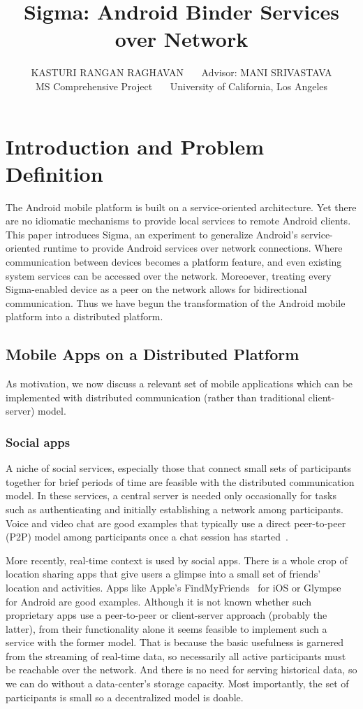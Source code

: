 \documentclass[prodmode]{acmlarge}
\title{Sigma: Android Binder Services over Network}
\author{KASTURI RANGAN RAGHAVAN~~~
Advisor: MANI SRIVASTAVA\\
MS Comprehensive Project~~~
University of California, Los Angeles
}
\begin{document}
\pagestyle{plain}
\maketitle
\tableofcontents

\clearpage
\section{Introduction and Problem Definition}

The Android mobile platform is built on a service-oriented architecture. Yet there are no idiomatic mechanisms to provide local services to remote Android clients. This paper introduces Sigma, an experiment to generalize Android's service-oriented runtime to provide Android services over network connections. Where communication between devices becomes a platform feature, and even existing system services can be accessed over the network. Moreoever, treating every Sigma-enabled device as a peer on the network allows for bidirectional communication. Thus we have begun the transformation of the Android mobile platform into a distributed platform.

\subsection{Mobile Apps on a Distributed Platform}
As motivation, we now discuss a relevant set of mobile applications which can be implemented with distributed communication (rather than traditional client-server) model.

\subsubsection{Social apps}
A niche of social services, especially those that connect small sets of participants together for brief periods of time are feasible with the distributed communication model. In these services, a central server is needed only occasionally for tasks such as authenticating and initially establishing a network among participants. Voice and video chat are good examples that typically use a direct peer-to-peer (P2P) model among participants once a chat session has started~\cite{SkypeStudy,GoogleTalkLibrary}.

More recently, real-time context is used by social apps. There is a whole crop of location sharing apps that give users a glimpse into a small set of friends' location and activities. Apps like Apple's FindMyFriends~\cite{FindMyFriends} for iOS or Glympse~\cite{Glympse} for Android are good examples. Although it is not known whether such proprietary apps use a peer-to-peer or client-server approach (probably the latter), from their functionality alone it seems feasible to implement such a service with the former model. That is because the basic usefulness is garnered from the streaming of real-time data, so necessarily all active participants must be reachable over the network. And there is no need for serving historical data, so we can do without a data-center's storage capacity. Most importantly, the set of participants is small so a decentralized model is doable.
\end{document}
